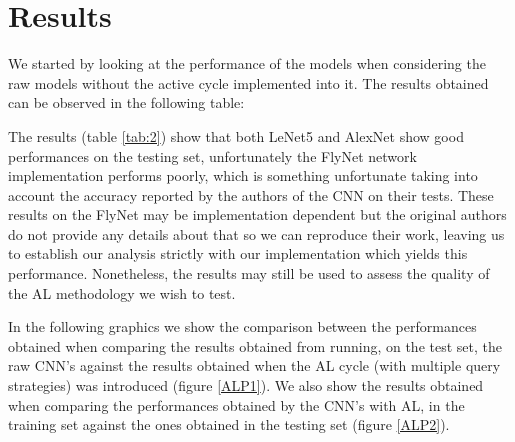 \documentclass[journal, a4paper]{IEEEtran}
\begin{document}
\section{Results}

We started by looking at the performance of the models when considering the raw models without
the active cycle implemented into it. The results obtained can be observed in the following table:

\begin{table}[htpb]
    \centering
    \caption{Average CNN's accuracy over 30 runs (test set)}
    \label{tab:2}
\end{table}

The results (table \ref{tab:2}) show that both LeNet5 and AlexNet show good performances on 
the testing set, unfortunately the FlyNet network implementation performs poorly, which 
is something unfortunate taking into account the accuracy reported by the authors of the 
CNN \cite{tan2021flying} on their tests. These results on the FlyNet may be 
implementation dependent but the original authors do not provide any details about that so 
we can reproduce their work, leaving us to establish our analysis
strictly with our implementation which yields this performance. Nonetheless, the results may 
still be used to assess the quality of the AL methodology we wish to test.

In the following graphics we show the comparison between the performances obtained when 
comparing the results obtained from running, on the test set, the raw CNN's against the 
results obtained when the AL cycle (with multiple query strategies) was introduced 
(figure \ref{ALP1}). We also show the results obtained when comparing the performances 
obtained by the CNN's with AL, in the training set against the ones obtained in the testing set (figure \ref{ALP2}).
\end{document}

